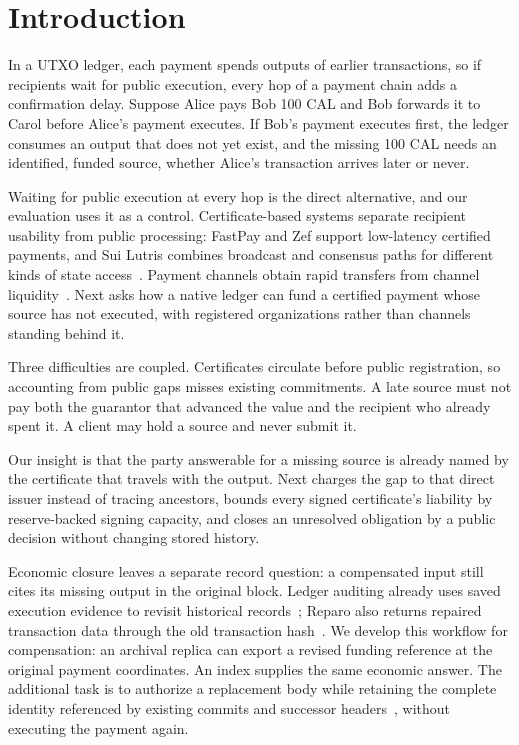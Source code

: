 \section{Introduction}
\label{sec:introduction}

In a UTXO ledger, each payment spends outputs of earlier transactions, so if recipients wait for public execution, every hop of a payment chain adds a confirmation delay. Suppose Alice pays Bob 100 CAL and Bob forwards it to Carol before Alice's payment executes. If Bob's payment executes first, the ledger consumes an output that does not yet exist, and the missing 100 CAL needs an identified, funded source, whether Alice's transaction arrives later or never.

Waiting for public execution at every hop is the direct alternative, and our evaluation uses it as a control. Certificate-based systems separate recipient usability from public processing: FastPay and Zef support low-latency certified payments, and Sui Lutris combines broadcast and consensus paths for different kinds of state access~\cite{fastpay,zef,lutris}. Payment channels obtain rapid transfers from channel liquidity~\cite{blitz,donner}. Next asks how a native ledger can fund a certified payment whose source has not executed, with registered organizations rather than channels standing behind it.

Three difficulties are coupled. Certificates circulate before public registration, so accounting from public gaps misses existing commitments. A late source must not pay both the guarantor that advanced the value and the recipient who already spent it. A client may hold a source and never submit it.

Our insight is that the party answerable for a missing source is already named by the certificate that travels with the output. Next charges the gap to that direct issuer instead of tracing ancestors, bounds every signed certificate's liability by reserve-backed signing capacity, and closes an unresolved obligation by a public decision without changing stored history.

Economic closure leaves a separate record question: a compensated input still cites its missing output in the original block. Ledger auditing already uses saved execution evidence to revisit historical records~\cite{ia-ccf}; Reparo also returns repaired transaction data through the old transaction hash~\cite{reparo}. We develop this workflow for compensation: an archival replica can export a revised funding reference at the original payment coordinates. An index supplies the same economic answer. The additional task is to authorize a replacement body while retaining the complete identity referenced by existing commits and successor headers~\cite{comet-blockid}, without executing the payment again.

